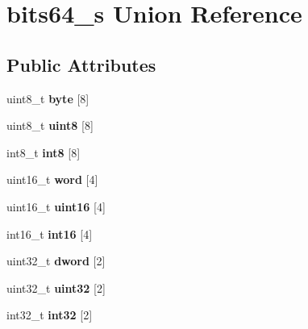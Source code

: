 \hypertarget{unionbits64__s}{}\section{bits64\+\_\+s Union Reference}
\label{unionbits64__s}
\subsection*{Public Attributes}
\begin{DoxyCompactItemize}
\item 
\hypertarget{unionbits64__s_a344daa9a96941a95e121a2a156444088}{}\label{unionbits64__s_a344daa9a96941a95e121a2a156444088} 
uint8\+\_\+t {\bfseries byte} \mbox{[}8\mbox{]}
\item 
\hypertarget{unionbits64__s_aa1deae37474f4b3a09a9d95012289c37}{}\label{unionbits64__s_aa1deae37474f4b3a09a9d95012289c37} 
uint8\+\_\+t {\bfseries uint8} \mbox{[}8\mbox{]}
\item 
\hypertarget{unionbits64__s_ac2a4a500d1575c4c740aed8bfc4af7dc}{}\label{unionbits64__s_ac2a4a500d1575c4c740aed8bfc4af7dc} 
int8\+\_\+t {\bfseries int8} \mbox{[}8\mbox{]}
\item 
\hypertarget{unionbits64__s_aeb197b51b01b758924e66ee2d54a4801}{}\label{unionbits64__s_aeb197b51b01b758924e66ee2d54a4801} 
uint16\+\_\+t {\bfseries word} \mbox{[}4\mbox{]}
\item 
\hypertarget{unionbits64__s_a2959e9fa320544bc4071e85f48dc184c}{}\label{unionbits64__s_a2959e9fa320544bc4071e85f48dc184c} 
uint16\+\_\+t {\bfseries uint16} \mbox{[}4\mbox{]}
\item 
\hypertarget{unionbits64__s_a60c8fbf2660498a495db9132abf9a7ba}{}\label{unionbits64__s_a60c8fbf2660498a495db9132abf9a7ba} 
int16\+\_\+t {\bfseries int16} \mbox{[}4\mbox{]}
\item 
\hypertarget{unionbits64__s_a4e93beedb02f7946a822b322b1b223a3}{}\label{unionbits64__s_a4e93beedb02f7946a822b322b1b223a3} 
uint32\+\_\+t {\bfseries dword} \mbox{[}2\mbox{]}
\item 
\hypertarget{unionbits64__s_a9c026978baedf71f7d587d8dba3d81bb}{}\label{unionbits64__s_a9c026978baedf71f7d587d8dba3d81bb} 
uint32\+\_\+t {\bfseries uint32} \mbox{[}2\mbox{]}
\item 
\hypertarget{unionbits64__s_a5a6e3c19e144a66c4923c3ea47d9bb23}{}\label{unionbits64__s_a5a6e3c19e144a66c4923c3ea47d9bb23} 
int32\+\_\+t {\bfseries int32} \mbox{[}2\mbox{]}
\item 
\hypertarget{unionbits64__s_a6b815502e09f58865868c040d132d809}{}\label{unionbits64__s_a6b815502e09f58865868c040d132d809} 

\end{DoxyCompactItemize}
